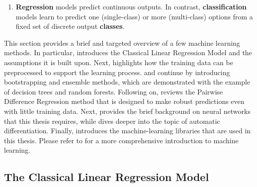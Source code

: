 \begin{enumerate}
    \item \textbf{Regression} models predict continuous outputs. In contrast, \textbf{classification} models learn to predict one (single-class) or more (multi-class) options from a fixed set of discrete output \textbf{classes}.
\end{enumerate}

\noindent This section provides a brief and targeted overview of a few machine learning methods. In particular,  introduces the Classical Linear Regression Model and the assumptions it is built upon. Next,  highlights how the training data can be preprocessed to support the learning process.  and  continue by introducing bootstrapping and ensemble methods, which are demonstrated with the example of decision trees and random forests. Following on,  reviews the Pairwise Difference Regression method that is designed to make robust predictions even with little training data. Next,  provides the brief background on neural networks that this thesis requires, while  dives deeper into the topic of automatic differentiation. Finally,  introduces the machine-learning libraries that are used in this thesis. Please refer to \textcite{machine-learning-1997} for a more comprehensive introduction to machine learning.

\subsection{The Classical Linear Regression Model} \label{txt:linear-model}

